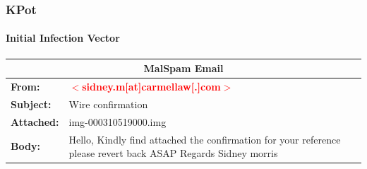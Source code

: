 \documentclass[aspectratio=169]{beamer}
\begin{document}
{
\begin{frame}
  \frametitle{KPot}
  \framesubtitle{Initial Infection Vector}
  \begin{tabularx}{\textwidth}{ |X|X| }
    \hline
    \multicolumn{2}{|c|}{\textbf{MalSpam Email}} \\
    \hline
    \textbf{From:} & \textbf{\textcolor{red}{$<$sidney.m[at]carmellaw[.]com$>$}} \\
    \hline
    \textbf{Subject:} & Wire confirmation \\
    \hline
    \textbf{Attached:} & img-000310519000.img \\
    \hline
    \textbf{Body:} & Hello,
    \newline
    \newline
    Kindly find attached the confirmation for your reference
    \newline
    \newline
    please revert back ASAP
    \newline
    \newline
    Regards
    \newline
    \newline
    Sidney morris \\
    \hline
  \end{tabularx}
\end{frame}
}
\end{document}
